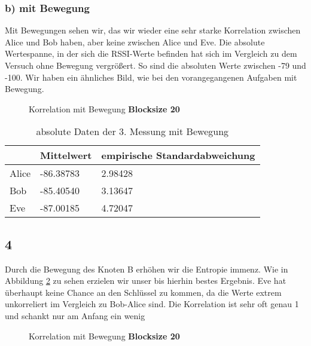 \documentclass[12pt,a4paper]{article}
\begin{document}
\subsubsection*{b) mit Bewegung}
Mit Bewegungen sehen wir, das wir wieder eine sehr starke Korrelation zwischen Alice und Bob haben, aber keine zwischen Alice und Eve. Die absolute Wertespanne, in der sich die RSSI-Werte befinden hat sich im Vergleich zu dem Versuch ohne Bewegung vergrößert. So sind die absoluten Werte zwischen -79 und -100. Wir haben ein ähnliches Bild, wie bei den vorangegangenen Aufgaben mit Bewegung. 
\begin{figure}[H]
\centering
{} \qquad
{}
\caption{Korrelation mit Bewegung \textbf{Blocksize 20}}
\label{fig:3_b_m}
\end{figure}

\begin{table}[H]
\centering
\begin{tabular}{l|l|l}
& Mittelwert & empirische Standardabweichung \\
\hline
Alice & -86.38783 & 2.98428 \\
\hline
Bob & -85.40540 & 3.13647 \\
\hline
Eve & -87.00185 & 4.72047 \\
\end{tabular}
\caption{absolute Daten der 3. Messung mit Bewegung}
\end{table}

\subsection*{4}
Durch die Bewegung des Knoten B erhöhen wir die Entropie immenz. Wie in Abbildung \ref{fig:4} zu sehen erzielen wir unser bis hierhin bestes Ergebnis. Eve hat überhaupt keine Chance an den Schlüssel zu kommen, da die Werte extrem unkorreliert im Vergleich zu Bob-Alice sind. Die Korrelation ist sehr oft genau 1 und schankt nur am Anfang ein wenig
\begin{figure}[H]
\centering
{} \qquad
{}
\caption{Korrelation mit Bewegung \textbf{Blocksize 20}}
\label{fig:4}
\end{figure}
\end{document}
